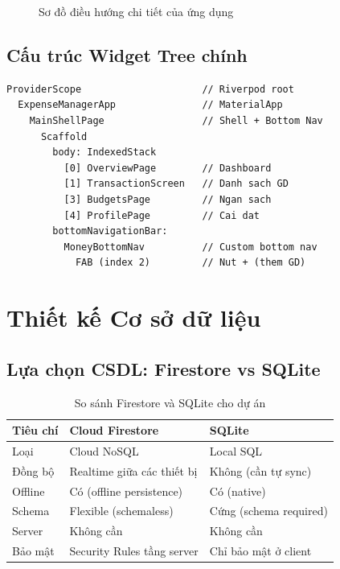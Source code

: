 \begin{figure}[H]
\caption{Sơ đồ điều hướng chi tiết của ứng dụng}
\label{fig:nav-detail}
\end{figure}

\subsection{Cấu trúc Widget Tree chính}

\begin{lstlisting}[caption={Widget tree đơn giản hóa}]
ProviderScope                     // Riverpod root
  ExpenseManagerApp               // MaterialApp
    MainShellPage                 // Shell + Bottom Nav
      Scaffold
        body: IndexedStack
          [0] OverviewPage        // Dashboard
          [1] TransactionScreen   // Danh sach GD
          [3] BudgetsPage         // Ngan sach
          [4] ProfilePage         // Cai dat
        bottomNavigationBar:
          MoneyBottomNav          // Custom bottom nav
            FAB (index 2)         // Nut + (them GD)
\end{lstlisting}

\section{Thiết kế Cơ sở dữ liệu}

\subsection{Lựa chọn CSDL: Firestore vs SQLite}

\begin{table}[H]
\centering
\caption{So sánh Firestore và SQLite cho dự án}
\begin{tabularx}{\textwidth}{|l|X|X|}
\hline
\textbf{Tiêu chí} & \textbf{Cloud Firestore} & \textbf{SQLite} \\
\hline
Loại & Cloud NoSQL & Local SQL \\
\hline
Đồng bộ & Realtime giữa các thiết bị & Không (cần tự sync) \\
\hline
Offline & Có (offline persistence) & Có (native) \\
\hline
Schema & Flexible (schemaless) & Cứng (schema required) \\
\hline
Server & Không cần & Không cần \\
\hline
Bảo mật & Security Rules tầng server & Chỉ bảo mật ở client \\
\hline
\end{tabularx}
\end{table}

